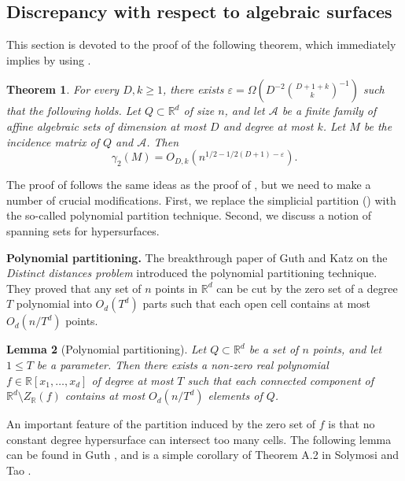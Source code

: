 \documentclass[11pt]{article}
\theoremstyle{plain}
\newtheorem{theorem}{Theorem}[section]
\newtheorem{lemma}[theorem]{Lemma}
\theoremstyle{definition}
\newcommand{\eps}{\varepsilon}
\begin{document}
    \subsection{Discrepancy with respect to algebraic surfaces}
    
	This section is devoted to the proof of the following theorem, which immediately implies  by using .
	
	\begin{theorem}\label{thm:variety}
		For every $D,k\geq 1$, there exists $\eps=\Omega(D^{-2}\binom{D+1+k}{k}^{-1})$ such that the following holds. Let $Q\subset \mathbb{R}^{d}$ of size $n$, and let $\mathcal{A}$ be a finite family of affine algebraic sets of dimension at most $D$ and degree at most $k$. Let $M$ be the incidence matrix of $Q$ and $\mathcal{A}$. Then
		$$\gamma_2(M)=O_{D,k}(n^{1/2-1/2(D+1)-\eps}).$$
	\end{theorem}
	
	The proof of  follows the same ideas as the proof of , but we need to make a number of crucial modifications. First, we replace the simplicial partition () with the so-called polynomial partition technique. Second, we discuss a notion of spanning sets for hypersurfaces.
	
	\bigskip
	
	\noindent
	\textbf{Polynomial partitioning.} The breakthrough paper of Guth and Katz \cite{GK} on the \emph{Distinct distances problem} introduced the polynomial partitioning technique. They proved that any set of $n$ points in $\mathbb{R}^d$ can be cut by the zero set of a degree $T$ polynomial into $O_d(T^d)$ parts such that each open cell contains at most $O_d(n/T^d)$ points.
	
	\begin{lemma}[Polynomial partitioning]\label{lemma:poly_partition}
		Let $Q\subset \mathbb{R}^d$ be a set of $n$ points, and let $1\leq T$ be a parameter. Then there exists a non-zero real polynomial $f\in \mathbb{R}[x_1,\dots,x_d]$ of degree at most $T$ such that each connected component of $\mathbb{R}^d\setminus Z_{\mathbb{R}}(f)$ contains at most $O_d(n/T^d)$ elements of $Q$.
	\end{lemma}
	
	An important feature of the partition induced by the zero set of $f$ is that no constant degree hypersurface can intersect too many cells. The following lemma can be found in Guth \cite{Guth}, and is a simple corollary of Theorem A.2 in Solymosi and Tao \cite{ST}.
	
\end{document}
